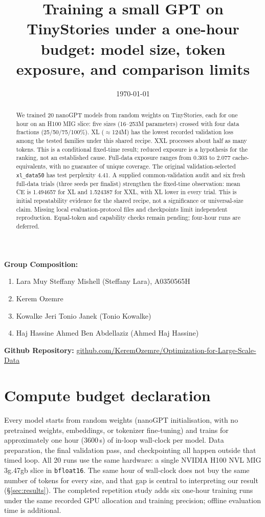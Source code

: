 \documentclass[12pt]{article}
\author{}
\title{Training a small GPT on TinyStories under a one-hour budget:
model size, token exposure, and comparison limits}
\date{\today}
\begin{document}
\maketitle

{\bf Group Composition:}
\begin{enumerate}
\item Lara Muy Steffany Mishell (Steffany Lara), A0350565H
\item Kerem Ozemre
\item Kowalke Jeri Tonio Janek (Tonio Kowalke)
\item Haj Hassine Ahmed Ben Abdellaziz (Ahmed Haj Hassine)
\end{enumerate}

{\bf Github Repository:}
\href{https://github.com/KeremOzemre/Optimization-for-Large-Scale-Data}{github.com/KeremOzemre/\allowbreak Optimization-for-Large-Scale-Data}

\begin{abstract}
We trained 20 nanoGPT models from random weights on TinyStories, each for one hour
on an H100 MIG slice: five sizes (16--253M parameters) crossed with four data
fractions (25/50/75/100\%). XL ($\approx$124M) has the lowest recorded validation
loss among the tested families under this shared recipe. XXL processes about half
as many tokens. This is a conditional fixed-time result; reduced exposure is a
hypothesis for the ranking, not an established cause. Full-data exposure ranges
from 0.303 to 2.077 cache-equivalents, with no guarantee of unique coverage.
The original validation-selected \texttt{xl\_data50} has test perplexity 4.41.
A supplied common-validation audit and six fresh full-data trials (three seeds per
finalist) strengthen the fixed-time observation: mean CE is 1.494657 for XL and
1.524387 for XXL, with XL lower in every trial. This is initial repeatability
evidence for the shared recipe, not a significance or universal-size claim.
Missing local evaluation-protocol files and checkpoints limit independent
reproduction. Equal-token and capability checks remain pending; four-hour runs are deferred.
\end{abstract}


\section{Compute budget declaration}
Every model starts from random weights (nanoGPT initialisation, with no pretrained
weights, embeddings, or tokenizer fine-tuning) and trains for approximately one hour
(3600\,s) of in-loop wall-clock per model. Data preparation, the final validation
pass, and checkpointing all happen outside that timed loop. All 20 runs use the same
hardware: a single NVIDIA H100 NVL MIG 3g.47gb slice in \texttt{bfloat16}. The same
hour of wall-clock does not buy the same number of tokens for every size, and that
gap is central to interpreting our result (\S\ref{sec:results}). The completed
repetition study adds six one-hour training runs under the same recorded GPU
allocation and training precision; offline evaluation time is additional.
\end{document}
